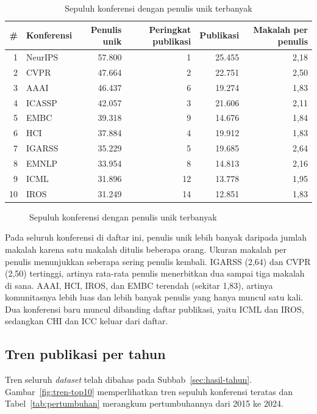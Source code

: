\begin{table}[ht]
\caption{Sepuluh konferensi dengan penulis unik terbanyak}
\label{tab:top-author}
\small
\begin{tabular}{@{}rlrrrr@{}}
\toprule
\textbf{\#} & \textbf{Konferensi} & \textbf{Penulis unik} & \textbf{Peringkat publikasi} & \textbf{Publikasi} & \textbf{Makalah per penulis} \\
\midrule
1 & NeurIPS & 57.800 & 1 & 25.455 & 2,18 \\
2 & CVPR & 47.664 & 2 & 22.751 & 2,50 \\
3 & AAAI & 46.437 & 6 & 19.274 & 1,83 \\
4 & ICASSP & 42.057 & 3 & 21.606 & 2,11 \\
5 & EMBC & 39.318 & 9 & 14.676 & 1,84 \\
6 & HCI & 37.884 & 4 & 19.912 & 1,83 \\
7 & IGARSS & 35.229 & 5 & 19.685 & 2,64 \\
8 & EMNLP & 33.954 & 8 & 14.813 & 2,16 \\
9 & ICML & 31.896 & 12 & 13.778 & 1,95 \\
10 & IROS & 31.249 & 14 & 12.851 & 1,83 \\
\bottomrule
\end{tabular}
\end{table}

\begin{figure}[ht]
\centering
{}
\caption{Sepuluh konferensi dengan penulis unik terbanyak}
\label{fig:top-author}
\end{figure}

Pada seluruh konferensi di daftar ini, penulis unik lebih banyak daripada jumlah makalah karena satu makalah ditulis beberapa orang. Ukuran makalah per penulis menunjukkan seberapa sering penulis kembali. IGARSS (2,64) dan CVPR (2,50) tertinggi, artinya rata-rata penulis menerbitkan dua sampai tiga makalah di sana. AAAI, HCI, IROS, dan EMBC terendah (sekitar 1,83), artinya komunitasnya lebih luas dan lebih banyak penulis yang hanya muncul satu kali. Dua konferensi baru muncul dibanding daftar publikasi, yaitu ICML dan IROS, sedangkan CHI dan ICC keluar dari daftar.

\subsection{Tren publikasi per tahun}
\label{sec:hasil-tren}
Tren seluruh \textit{dataset} telah dibahas pada Subbab~\ref{sec:hasil-tahun}. Gambar~\ref{fig:tren-top10} memperlihatkan tren sepuluh konferensi teratas dan Tabel~\ref{tab:pertumbuhan} merangkum pertumbuhannya dari 2015 ke 2024.


